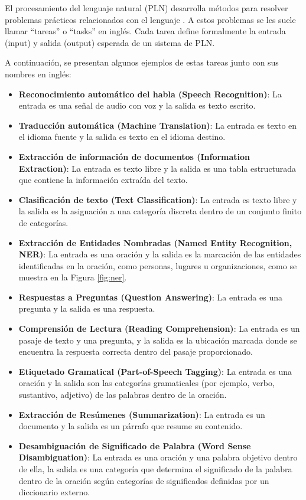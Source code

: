 El procesamiento del lenguaje natural (PLN) desarrolla métodos para resolver problemas prácticos relacionados con el lenguaje \cite{JohnsonMLSS}. A estos problemas se les suele llamar ``tareas'' o ``tasks'' en inglés. Cada tarea define formalmente la entrada (input) y salida (output) esperada de un sistema de PLN.

A continuación, se presentan algunos ejemplos de estas tareas junto con sus nombres en inglés:

\begin{itemize}
  \item \textbf{Reconocimiento automático del habla (Speech Recognition)}: La entrada es una señal de audio con voz y la salida es texto escrito.
  \item \textbf{Traducción automática (Machine Translation)}: La entrada es texto en el idioma fuente y la salida es texto en el idioma destino.
  \item \textbf{Extracción de información de documentos (Information Extraction)}: La entrada es texto libre y la salida es una tabla estructurada que contiene la información extraída del texto.
  \item \textbf{Clasificación de texto (Text Classification)}: La entrada es texto libre y la salida es la asignación a una categoría discreta dentro de un conjunto finito de categorías.
  \item \textbf{Extracción de Entidades Nombradas (Named Entity Recognition, NER)}: La entrada es una oración y la salida es la marcación de las entidades identificadas en la oración, como personas, lugares u organizaciones, como se muestra en la Figura \ref{fig:ner}.
  \item \textbf{Respuestas a Preguntas (Question Answering)}: La entrada es una pregunta y la salida es una respuesta.
  \item \textbf{Comprensión de Lectura (Reading Comprehension)}: La entrada es un pasaje de texto y una pregunta, y la salida es la ubicación marcada donde se encuentra la respuesta correcta dentro del pasaje proporcionado.
  \item \textbf{Etiquetado Gramatical (Part-of-Speech Tagging)}: La entrada es una oración y la salida son las categorías gramaticales (por ejemplo, verbo, sustantivo, adjetivo) de las palabras dentro de la oración.
  \item \textbf{Extracción de Resúmenes (Summarization)}: La entrada es un documento y la salida es un párrafo que resume su contenido.
  \item \textbf{Desambiguación de Significado de Palabra (Word Sense Disambiguation)}: La entrada es una oración y una palabra objetivo dentro de ella, la salida es una categoría que determina el  significado de la palabra dentro de la oración según categorías de significados definidas por un diccionario externo.

\end{itemize}

